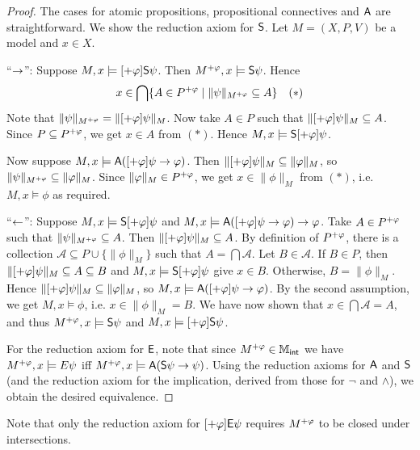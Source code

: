 \begin{proof}
The cases for atomic propositions, propositional connectives and
$\A$ are straightforward. We show the reduction axiom for
$\S$. Let $M = (X, P, V)$ be a model and $x \in X$.

``$\limplies$'': Suppose $M, x \models [\expinc\phi]\S\psi$.
Then $M^{\expinc\phi}, x \models \S\psi$. Hence
\[
x \in
\bigcap\{
   A \in P^{\expinc\phi}
   \mid
   \|\psi\|_{M^{\expinc\phi}} \subseteq A
\}
\quad (*)\]
Note that $\|\psi\|_{M^{\expinc\phi}} = \|[\expinc\phi]\psi\|_M$.
Now take $A \in P$ such that $\|[\expinc\phi]\psi\|_M
\subseteq A$. Since $P \subseteq P^{\expinc\phi}$, we get $x
\in A$ from $(*)$. Hence $M, x \models \S[\expinc\phi]\psi$.

Now suppose $M, x \models \A([\expinc\phi]\psi \limplies \phi)$.
Then $\|[\expinc\phi]\psi\|_M \subseteq \|\phi\|_M$, so
$\|\psi\|_{M^{\expinc\phi}} \subseteq \|\phi\|_M$. Since
$\|\phi\|_M \in P^{\expinc\phi}$, we get $x \in \|\phi\|_M$
from $(*)$, i.e. $M, x \models \phi$ as required.

``$\limpliedby$'': Suppose $M, x \models \S[\expinc\phi]\psi$
and $M, x \models \A([\expinc\phi]\psi \limplies \phi) \limplies
\phi$. Take $A \in P^{\expinc\phi}$ such that
$\|\psi\|_{M^{\expinc\phi}} \subseteq A$. Then
$\|[\expinc\phi]\psi\|_M \subseteq A$. By definition of
$P^{\expinc\phi}$, there is a collection $\mathcal{A}
\subseteq P \cup \{\|\phi\|_M\}$ such that $A =
\bigcap\mathcal{A}$. Let $B \in \mathcal{A}$. If $B \in P$,
then $\|[\expinc\phi]\psi\|_M \subseteq A \subseteq B$ and
$M, x \models \S[\expinc\phi]\psi$ give $x \in B$. Otherwise,
$B = \|\phi\|_M$. Hence $\|[\expinc\phi]\psi\|_M \subseteq
\|\phi\|_M$, so $M, x \models \A([\expinc\phi]\psi \limplies
\phi)$. By the second assumption, we get $M, x \models \phi$, i.e.
$x \in \|\phi\|_M = B$. We have now shown that $x \in
\bigcap\mathcal{A} = A$, and thus $M^{\expinc\phi}, x \models
\S\psi$ and $M, x \models [\expinc\phi]\S\psi$.

For the reduction axiom for $\E$, note that since
$M^{\expinc\phi} \in \Mint$ we have $M^{\expinc\phi}, x
\models E\psi$ iff $M^{\expinc\phi}, x \models \A(\S\psi \limplies
\psi)$. Using the reduction axioms for $\A$ and $\S$ (and the
reduction axiom for the implication, derived from those for $\neg$
and $\land$), we obtain the desired equivalence.
\end{proof}

Note that only the reduction axiom for $[\expinc\phi]\E\psi$ requires
$M^{\expinc\phi}$ to be closed under intersections.

